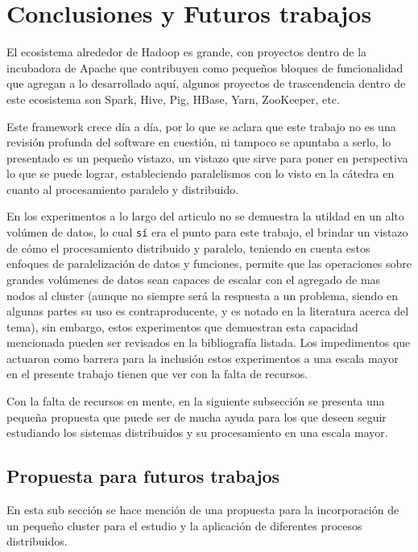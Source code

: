 \section{Conclusiones y Futuros trabajos}
\label{sec:conclusiones_y_futuros_trabajos}
El ecosistema alrededor de Hadoop es grande, con proyectos dentro de la
incubadora de Apache que contribuyen como pequeños bloques de funcionalidad que
agregan a lo desarrollado aquí, algunos proyectos de trascendencia dentro de este
ecosistema son Spark, Hive, Pig, HBase, Yarn, ZooKeeper, etc.

Este \gls{framework} crece día a día, por lo que se aclara que este trabajo no
es una revisión profunda del software en cuestión, ni tampoco se apuntaba a
serlo, lo presentado es un pequeño vistazo, un vistazo que sirve para
poner en perspectiva lo que se puede lograr, estableciendo paralelismos con lo
visto en la cátedra en cuanto al procesamiento paralelo y distribuido.

En los experimentos a lo largo del articulo no se demuestra la
utildad en un alto volúmen de datos, lo cual {\tt sí} era el punto para este
trabajo, el brindar un vistazo de cómo el procesamiento distribuido y paralelo,
teniendo en cuenta estos enfoques de paralelización de datos y funciones, 
permite que las operaciones sobre grandes volúmenes de datos sean capaces de 
escalar con el agregado de mas nodos al
\gls{cluster} (aunque no siempre será la respuesta a un problema, siendo en
algunas partes su uso es contraproducente, y es notado en la literatura acerca
del tema), sin embargo, estos experimentos que demuestran esta capacidad
mencionada pueden ser revisados en la bibliografía listada. Los
impedimentos que actuaron como barrera para la inclusión estos experimentos a 
una escala mayor en el presente trabajo tienen que ver con la falta de
recursos.

Con la falta de recursos en mente, en la siguiente subsección se presenta una
pequeña propuesta que puede ser de mucha ayuda para los que deseen seguir estudiando
los sistemas distribuidos y su procesamiento en una escala mayor.

\subsection{Propuesta para futuros trabajos}
\label{sec:propuesta}

En esta sub sección se hace mención de una propuesta para la incorporación de un
pequeño \gls{cluster} para el estudio y la aplicación de diferentes procesos
distribuidos.

